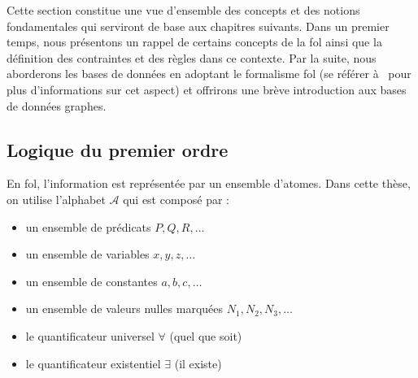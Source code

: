 Cette section constitue une vue d'ensemble des concepts et des notions fondamentales qui serviront de base aux chapitres suivants.
Dans un premier temps, nous présentons un rappel de certains concepts de la \gls{fol} ainsi que la définition des contraintes et des règles dans ce contexte.
Par la suite, nous aborderons les bases de données en adoptant le formalisme \gls{fol} (se référer à~\cite{abiteboulFoundationsDatabases1995} pour plus d'informations sur cet aspect) et offrirons une brève introduction aux bases de données graphes.

\subsection{Logique du premier ordre}
\label{sec:update:pre:logic}


En \gls{fol}, l'information est représentée par un ensemble d'atomes.
Dans cette thèse, on utilise l'alphabet $\mathcal{A}$ qui est composé par :
\begin{itemize}
    \item un ensemble de prédicats $P, Q, R, \dots$
    \item un ensemble de variables $x, y, z, \dots$
    \item un ensemble de constantes $a, b, c, \dots$
    \item un ensemble de valeurs nulles marquées $N_1, N_2, N_3, \dots$
    \item le quantificateur universel $\forall$ (quel que soit)
    \item le quantificateur existentiel $\exists$ (il existe)
\end{itemize}

